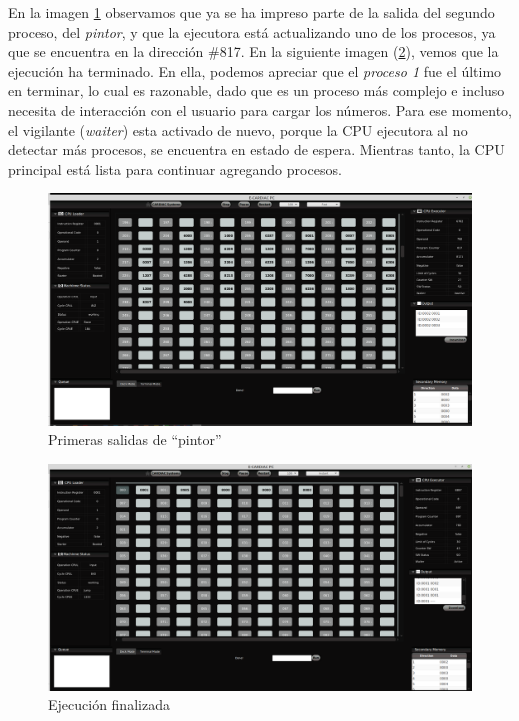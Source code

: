 \documentclass[letterpaper,12pt,oneside]{book}
\begin{document}
			
			En la imagen \ref{fig:vm_starting_to_print_pintor} observamos
			que ya se ha impreso parte de la salida del segundo proceso, del \textit{pintor}, y
			que la ejecutora está actualizando uno de los procesos, ya que se encuentra
			en la dirección \#817. En la siguiente imagen (\ref{fig:vm_finish_the_execution}),
			 vemos que la ejecución ha terminado. En ella, podemos apreciar
			que el \textit{proceso 1} fue el último en terminar, lo cual es razonable, dado que es un proceso más complejo e incluso necesita
			de interacción con el usuario para cargar los números. Para ese momento, el vigilante 	(\textit{waiter}) esta
			activado de nuevo, porque la CPU ejecutora al no detectar más procesos, se encuentra en estado de espera. Mientras tanto,
			la CPU principal
			está lista para continuar agregando procesos. 
			
			
			
			\begin{figure}[h]		
				\centering
				\includegraphics[scale=0.26]{media/Paralela/vm_starting_to_print_pintor.png}
				\caption{Primeras salidas de ``pintor''}
				\label{fig:vm_starting_to_print_pintor}
			\end{figure}	
			
			
			\begin{figure}[h]		
				\centering
				\includegraphics[scale=0.26]{media/Paralela/vm_finish_the_execution.png}
				\caption{Ejecución finalizada}
				\label{fig:vm_finish_the_execution}
			\end{figure}	
			
\end{document}
